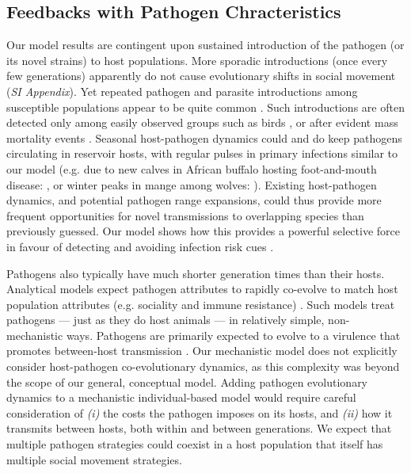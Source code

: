 \subsection*{Feedbacks with Pathogen Chracteristics}

Our model results are contingent upon sustained introduction of the pathogen (or its novel strains) to host populations.
More sporadic introductions (once every few generations) apparently do not cause evolutionary shifts in social movement (\textit{SI Appendix}).
Yet repeated pathogen and parasite introductions among susceptible populations appear to be quite common \autocite{levi2012,jolles2021,vosloo2009,bastos2000,scherer2020,globconsorth5n82016,wille2022}.
Such introductions are often detected only among easily observed groups such as birds \autocite{wille2022}, or after evident mass mortality events \autocite{fey2015,fereidouni2019}.
Seasonal host-pathogen dynamics could and do keep pathogens circulating in reservoir hosts, with regular pulses in primary infections similar to our model (e.g. due to new calves in African buffalo hosting foot-and-mouth disease: \cite{jolles2021}, or winter peaks in mange among wolves: \cite{almberg2015}).
Existing host-pathogen dynamics, and potential pathogen range expansions, could thus provide more frequent opportunities for novel transmissions to overlapping species than previously guessed.
Our model shows how this provides a powerful selective force in favour of detecting and avoiding infection risk cues \autocite{weinstein2018}.

Pathogens also typically have much shorter generation times than their hosts.
Analytical models expect pathogen attributes to rapidly co-evolve to match host population attributes (e.g. sociality and immune resistance) \citep[][]{bonds2005,prado2009,ashby2022}.
Such models treat pathogens --- just as they do host animals --- in relatively simple, non-mechanistic ways.
Pathogens are primarily expected to evolve to a virulence that promotes between-host transmission \citep{bonds2005}.
Our mechanistic model does not explicitly consider host-pathogen co-evolutionary dynamics, as this complexity was beyond the scope of our general, conceptual model.
Adding pathogen evolutionary dynamics to a mechanistic individual-based model would require careful consideration of \textit{(i)} the costs the pathogen imposes on its hosts, and \textit{(ii)} how it transmits between hosts, both within and between generations.
We expect that multiple pathogen strategies could coexist in a host population that itself has multiple social movement strategies.

